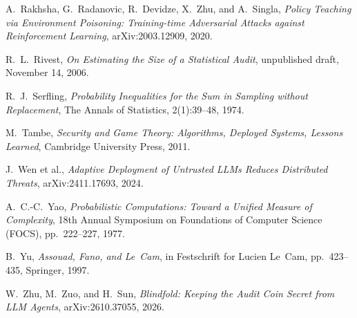 A.~Rakhsha, G.~Radanovic, R.~Devidze, X.~Zhu, and A.~Singla,
\emph{Policy Teaching via Environment Poisoning: Training-time Adversarial Attacks against Reinforcement Learning},
arXiv:2003.12909, 2020.

R.~L.~Rivest,
\emph{On Estimating the Size of a Statistical Audit},
unpublished draft, November 14, 2006.

R.~J.~Serfling,
\emph{Probability Inequalities for the Sum in Sampling without Replacement},
The Annals of Statistics, 2(1):39--48, 1974.

M.~Tambe,
\emph{Security and Game Theory: Algorithms, Deployed Systems, Lessons Learned},
Cambridge University Press, 2011.

J.~Wen et al.,
\emph{Adaptive Deployment of Untrusted LLMs Reduces Distributed Threats},
arXiv:2411.17693, 2024.

A.~C.-C.~Yao,
\emph{Probabilistic Computations: Toward a Unified Measure of Complexity},
18th Annual Symposium on Foundations of Computer Science (FOCS), pp.~222--227, 1977.

B.~Yu,
\emph{Assouad, Fano, and Le~Cam},
in Festschrift for Lucien Le~Cam, pp.~423--435, Springer, 1997.

W.~Zhu, M.~Zuo, and H.~Sun,
\emph{Blindfold: Keeping the Audit Coin Secret from LLM Agents},
arXiv:2610.37055, 2026.
